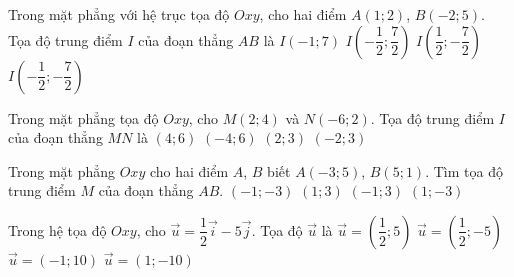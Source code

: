 \begin{ex}%
	Trong mặt phẳng với hệ trục tọa độ $Oxy$, cho hai điểm $A(1;2)$, $B(-2;5)$. Tọa độ trung  điểm $I$ của đoạn thẳng $AB$ là
	 \choice
		 {$I(-1;7)$}
		{\True $I\left(-\dfrac{1}{2};\dfrac{7}{2}\right)$} 
		{$I\left(\dfrac{1}{2};-\dfrac{7}{2}\right)$} 
		{$I\left(-\dfrac{1}{2};-\dfrac{7}{2}\right)$} 
\end{ex}

\begin{ex}%
	Trong mặt phẳng tọa độ $Oxy$, cho $M(2;4)$  và $N(-6;2)$. Tọa độ trung điểm $I$ của đoạn thẳng $MN$ là
	 \choice
		 {$(4;6)$}
		{$(-4;6)$} 
		 {$(2;3)$}
		{\True $(-2;3)$} 
\end{ex}

\begin{ex}%
	Trong mặt phẳng $Oxy$ cho hai điểm $A$, $B$ biết $A(-3;5)$, $B(5;1)$. Tìm tọa độ trung điểm $M$  của đoạn thẳng $AB$.
	\choice 
		 {$(-1;-3)$}
		 {\True $(1;3)$}
		 {$(-1;3)$}
		{$(1;-3)$} 
\end{ex}

\begin{ex}%
	Trong hệ tọa độ $Oxy$, cho $\overrightarrow{u}=\dfrac{1}{2} \overrightarrow{i}-5 \overrightarrow{j}$. Tọa  độ $\overrightarrow{u}$ là
	\choice 
		{$\overrightarrow{u}=\left(\dfrac{1}{2}; 5\right)$} 
		{\True $\overrightarrow{u}=\left(\dfrac{1}{2};-5\right)$} 
		{$\overrightarrow{u}=(-1;  10)$}
		{$\overrightarrow{u}=(1;-10)$} 
\end{ex}

